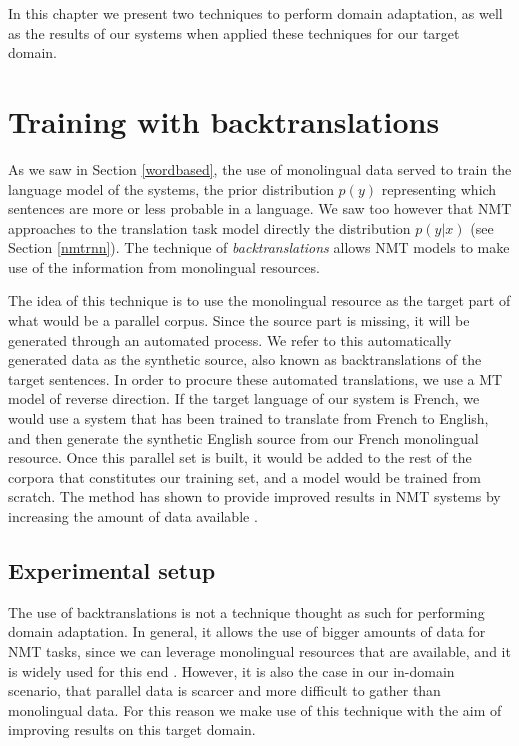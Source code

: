 \documentclass[11pt,english,listoffigures,listoftables]{tfgetsinf}
\begin{document}
In this chapter we present two techniques to perform domain adaptation, as well as the results of our systems when applied these techniques for our target domain. 

\section{Training with backtranslations}
As we saw in Section \ref{wordbased}, the use of monolingual data served to train the language model of the systems, the prior distribution $p(y)$ representing which sentences are more or less probable in a language. We saw too however that NMT approaches to the translation task model directly the distribution $p(y|x)$ (see Section \ref{nmtrnn}).
The technique of \textit{backtranslations} allows NMT models to make use of the information from monolingual resources. 

The idea of this technique is to use the monolingual resource as the target part of what would be a parallel corpus. Since the source part is missing, it will be generated through an automated process. We refer to this automatically generated data as the synthetic source, also known as backtranslations of the target sentences. In order to procure these automated translations, we use a MT model of reverse direction. If the target language of our system is French, we would use a system that has been trained to translate from French to English, and then generate the synthetic English source from our French monolingual resource. Once this parallel set is built, it would be added to the rest of the corpora that constitutes our training set, and a model would be trained from scratch. The method has shown to provide improved results in NMT systems by increasing the amount of data available \cite{DBLP:journals/corr/SennrichHB15a}.

\subsection{Experimental setup}\label{V4}
The use of backtranslations is not a technique thought as such for performing domain adaptation. In general, it allows the use of bigger amounts of data for NMT tasks, since we can leverage monolingual resources that are available, and it is widely used for this end \cite{DBLP:journals/corr/abs-1808-09381}. However, it is also the case in our in-domain scenario, that parallel data is scarcer and more difficult to gather than monolingual data. For this reason we make use of this technique with the aim of improving results on this target domain.
\end{document}
